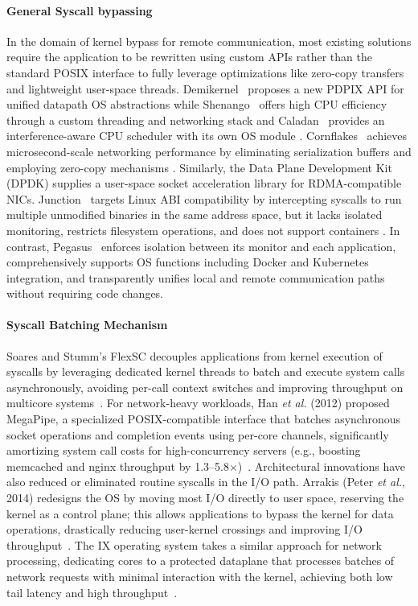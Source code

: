 \documentclass[sigconf,10pt]{acmart}
\begin{document}
\paragraph{General Syscall bypassing}
In the domain of kernel bypass for remote communication, most existing solutions require the application to be rewritten using custom APIs rather than the standard POSIX interface to fully leverage optimizations like zero-copy transfers and lightweight user-space threads. Demikernel~\cite{zhang2021demikernel} proposes a new PDPIX API for unified datapath OS abstractions  while Shenango~\cite{ousterhout2019shenango} offers high CPU efficiency through a custom threading and networking stack  and Caladan~\cite{fried2020caladan} provides an interference-aware CPU scheduler with its own OS module . Cornflakes~\cite{raghavan2023cornflakes} achieves microsecond-scale networking performance by eliminating serialization buffers and employing zero-copy mechanisms . Similarly, the Data Plane Development Kit (DPDK) supplies a user-space socket acceleration library for RDMA-compatible NICs. Junction~\cite{fried2024junction} targets Linux ABI compatibility by intercepting syscalls to run multiple unmodified binaries in the same address space, but it lacks isolated monitoring, restricts filesystem operations, and does not support containers . In contrast, Pegasus~\cite{peng2025pegasus} enforces isolation between its monitor and each application, comprehensively supports OS functions including Docker and Kubernetes integration, and transparently unifies local and remote communication paths without requiring code changes.

\paragraph{Syscall Batching Mechanism} 
Soares and Stumm’s FlexSC\cite{flexsc} decouples applications from kernel execution of syscalls by leveraging dedicated kernel threads to batch and execute system calls asynchronously, avoiding per-call context switches and improving throughput on multicore systems~\cite{Soares2010}. For network-heavy workloads, Han \emph{et al.} (2012) proposed MegaPipe, a specialized POSIX-compatible interface that batches asynchronous socket operations and completion events using per-core channels, significantly amortizing system call costs for high-concurrency servers (e.g., boosting memcached and nginx throughput by 1.3–5.8×)~\cite{Han2012}. Architectural innovations have also reduced or eliminated routine syscalls in the I/O path. Arrakis (Peter \emph{et al.}, 2014) redesigns the OS by moving most I/O directly to user space, reserving the kernel as a control plane; this allows applications to bypass the kernel for data operations, drastically reducing user-kernel crossings and improving I/O throughput~\cite{Peter2014}. The IX operating system\cite{ix} takes a similar approach for network processing, dedicating cores to a protected dataplane that processes batches of network requests with minimal interaction with the kernel, achieving both low tail latency and high throughput~\cite{Belay2014}.
\end{document}
